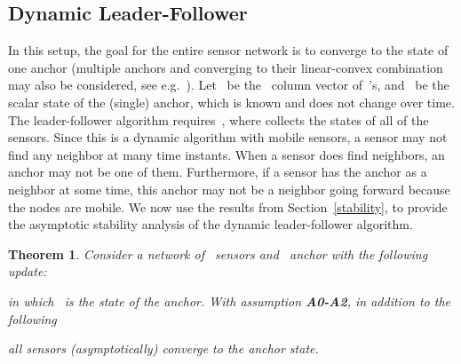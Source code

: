 \documentclass[draftclsnofoot, onecolumn, 12pt]{IEEEtran}
\newtheorem{thm}{Theorem}
\begin{document}
\subsection{Dynamic Leader-Follower}
In this setup, the goal for the entire sensor network is to converge to the state of one anchor (multiple anchors and converging to their linear-convex combination may also be considered, see e.g.~\cite{khan2009distributed,khan2010diland}). Let~ be the~ column vector of~’s, and~ be the scalar state of the (single) anchor, which is known and does not change over time. The leader-follower algorithm requires~, where  collects the states of all of the sensors. Since this is a dynamic algorithm with mobile sensors, a sensor may not find any neighbor at many time instants. When a sensor does find neighbors, an anchor may not be one of them. Furthermore, if a sensor has the anchor as a neighbor at some time, this anchor may not be a neighbor going forward because the nodes are mobile. We now use the results from Section~\ref{stability}, to provide the asymptotic stability analysis of the dynamic leader-follower algorithm. 
\begin{thm}
Consider a network of~ sensors and~ anchor with the following update:

in which~ is the state of the anchor. With assumption {\bf{A0-A2}}, in addition to the following

all sensors (asymptotically) converge to the anchor state.
\end{thm}
\end{document}
